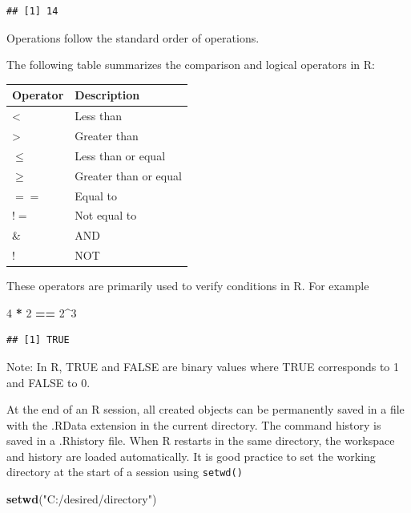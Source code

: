 \documentclass[
]{article}
\newenvironment{Shaded}{\begin{snugshade}}{\end{snugshade}}
\newcommand{\DecValTok}[1]{\textcolor[rgb]{0.00,0.00,0.81}{#1}}
\newcommand{\FunctionTok}[1]{\textcolor[rgb]{0.13,0.29,0.53}{\textbf{#1}}}
\newcommand{\NormalTok}[1]{#1}
\newcommand{\SpecialCharTok}[1]{\textcolor[rgb]{0.81,0.36,0.00}{\textbf{#1}}}
\newcommand{\StringTok}[1]{\textcolor[rgb]{0.31,0.60,0.02}{#1}}
\begin{document}
\begin{verbatim}
## [1] 14
\end{verbatim}

Operations follow the standard order of operations.

The following table summarizes the comparison and logical operators in
R:

\begin{longtable}[]{@{}ll@{}}
\toprule\noalign{}
Operator & Description \\
\midrule\noalign{}
\endhead
\bottomrule\noalign{}
\endlastfoot
\textless{} & Less than \\
\textgreater{} & Greater than \\
\(\le\) & Less than or equal \\
\(\ge\) & Greater than or equal \\
\(==\) & Equal to \\
\(!=\) & Not equal to \\
\& & AND \\
! & NOT \\
\end{longtable}

These operators are primarily used to verify conditions in R. For
example

\begin{Shaded}
\begin{Highlighting}[]
\DecValTok{4} \SpecialCharTok{*} \DecValTok{2} \SpecialCharTok{==} \DecValTok{2}\SpecialCharTok{\^{}}\DecValTok{3}
\end{Highlighting}
\end{Shaded}

\begin{verbatim}
## [1] TRUE
\end{verbatim}

Note: In R, TRUE and FALSE are binary values where TRUE corresponds to 1
and FALSE to 0.

At the end of an R session, all created objects can be permanently saved
in a file with the .RData extension in the current directory. The
command history is saved in a .Rhistory file. When R restarts in the
same directory, the workspace and history are loaded automatically. It
is good practice to set the working directory at the start of a session
using \texttt{setwd()}

\begin{Shaded}
\begin{Highlighting}[]
\FunctionTok{setwd}\NormalTok{(}\StringTok{"C:/desired/directory"}\NormalTok{)}
\end{Highlighting}
\end{Shaded}
\end{document}
